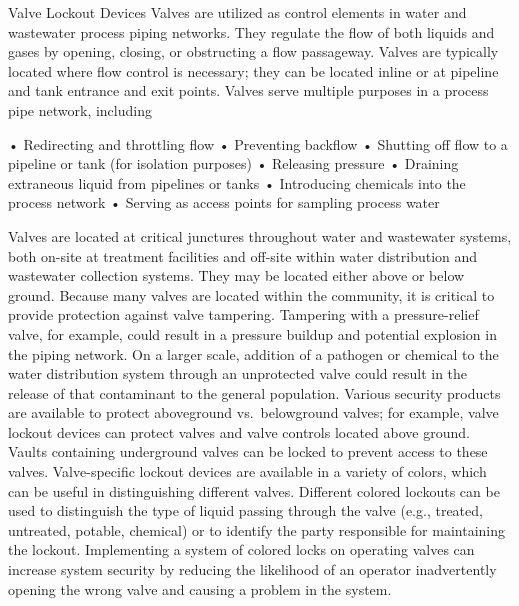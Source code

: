 \documentclass{article}
\begin{document}
Valve Lockout Devices Valves are utilized as control elements in water
and wastewater process piping networks. They regulate the flow of both
liquids and gases by opening, closing, or obstructing a flow passageway.
Valves are typically located where flow control is necessary; they can
be located inline or at pipeline and tank entrance and exit points.
Valves serve multiple purposes in a process pipe network, including

• Redirecting and throttling flow • Preventing backflow • Shutting off
flow to a pipeline or tank (for isolation purposes) • Releasing pressure
• Draining extraneous liquid from pipelines or tanks • Introducing
chemicals into the process network • Serving as access points for
sampling process water

Valves are located at critical junctures throughout water and wastewater
systems, both on-site at treatment facilities and off-site within water
distribution and wastewater collection systems. They may be located
either above or below ground. Because many valves are located within the
community, it is critical to provide protection against valve tampering.
Tampering with a pressure-relief valve, for example, could result in a
pressure buildup and potential explosion in the piping network. On a
larger scale, addition of a pathogen or chemical to the water
distribution system through an unprotected valve could result in the
release of that contaminant to the general population. Various security
products are available to protect aboveground vs.~belowground valves;
for example, valve lockout devices can protect valves and valve controls
located above ground. Vaults containing underground valves can be locked
to prevent access to these valves. Valve-specific lockout devices are
available in a variety of colors, which can be useful in distinguishing
different valves. Different colored lockouts can be used to distinguish
the type of liquid passing through the valve (e.g., treated, untreated,
potable, chemical) or to identify the party responsible for maintaining
the lockout. Implementing a system of colored locks on operating valves
can increase system security by reducing the likelihood of an operator
inadvertently opening the wrong valve and causing a problem in the
system.
\end{document}
